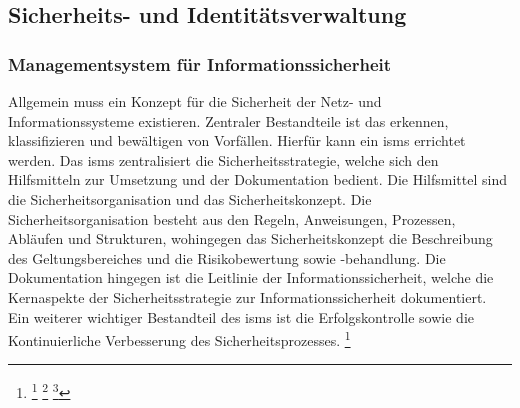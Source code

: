 \documentclass[11pt,a4paper,hidelinks]{article}   %
\begin{document}
        \subsection{Sicherheits- und Identitätsverwaltung}
            \subsubsection{Managementsystem für Informationssicherheit}
            Allgemein muss ein Konzept für die Sicherheit der Netz- und Informationssysteme existieren. Zentraler Bestandteile ist das erkennen, klassifizieren und bewältigen von Vorfällen. Hierfür kann ein \gls{isms} errichtet werden. Das \gls{isms} zentralisiert die Sicherheitsstrategie, welche sich den Hilfsmitteln zur Umsetzung und der Dokumentation bedient. Die Hilfsmittel sind die Sicherheitsorganisation und das Sicherheitskonzept. Die Sicherheitsorganisation besteht aus den Regeln, Anweisungen, Prozessen, Abläufen und Strukturen, wohingegen das Sicherheitskonzept die Beschreibung des Geltungsbereiches und die Risikobewertung sowie -behandlung. Die Dokumentation hingegen ist die Leitlinie der Informationssicherheit, welche die Kernaspekte der Sicherheitsstrategie zur Informationssicherheit dokumentiert. Ein weiterer wichtiger Bestandteil des \gls{isms} ist die Erfolgskontrolle sowie die Kontinuierliche Verbesserung des Sicherheitsprozesses.
            \footnote{
                \footcite[Vgl. S. 15 - 17, 18, 24 - 15, 33 - 34][]{bsi-200-1}
                \footcite[Vgl. S. 9 - 10][]{iso27001-2022}
                \footcite[Vgl. S. 47 - 50, 53 - 54][]{9781780175188}
            }
\end{document}

